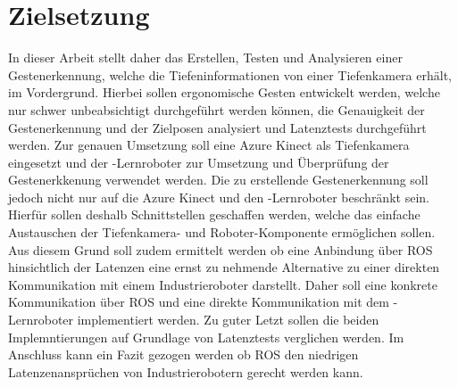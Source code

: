 \section{Zielsetzung} \label{sec:zielsetzung} %
In dieser Arbeit stellt daher das Erstellen, Testen und Analysieren einer Gestenerkennung, welche die Tiefeninformationen von einer Tiefenkamera erhält, im Vordergrund. Hierbei sollen ergonomische Gesten entwickelt werden, welche nur schwer unbeabsichtigt durchgeführt werden können, die Genauigkeit der Gestenerkennung und der Zielposen analysiert und Latenztests durchgeführt werden. Zur genauen Umsetzung soll eine Azure Kinect als Tiefenkamera eingesetzt und der -Lernroboter zur Umsetzung und Überprüfung der Gestenerkkenung verwendet werden. Die zu erstellende Gestenerkennung soll jedoch nicht nur auf die Azure Kinect und den -Lernroboter beschränkt sein. Hierfür sollen deshalb Schnittstellen geschaffen werden, welche das einfache Austauschen der Tiefenkamera- und Roboter-Komponente ermöglichen sollen. Aus diesem Grund soll zudem ermittelt werden ob eine Anbindung über ROS hinsichtlich der Latenzen eine ernst zu nehmende Alternative zu einer direkten Kommunikation mit einem Industrieroboter darstellt. Daher soll eine konkrete Kommunikation über ROS und eine direkte Kommunikation mit dem -Lernroboter implementiert werden. Zu guter Letzt sollen die beiden Implemntierungen auf Grundlage von Latenztests verglichen werden. Im Anschluss kann ein Fazit gezogen werden ob ROS den niedrigen Latenzenansprüchen von Industrierobotern gerecht werden kann.
